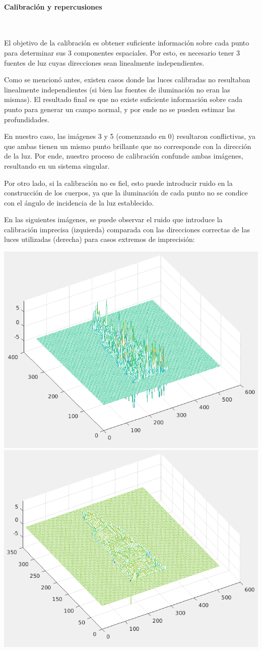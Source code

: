 \paragraph{Calibración y repercusiones}
\

El objetivo de la calibración es obtener suficiente información sobre cada punto
para determinar sus 3 componentes espaciales. Por esto, es necesario tener 3
fuentes de luz cuyas direcciones sean linealmente independientes.

Como se mencionó antes, existen casos donde las luces calibradas no resultaban
linealmente independientes (si bien las fuentes de iluminación no eran las mismas).
El resultado final es que no existe suficiente información sobre cada punto
para generar un campo normal, y por ende no se pueden estimar las profundidades.

En nuestro caso, las imágenes 3 y 5 (comenzando en 0) resultaron conflictivas,
ya que ambas tienen un mismo punto brillante que no corresponde con la dirección
de la luz. Por ende, nuestro proceso de calibración confunde ambas imágenes,
resultando en un sistema singular.

Por otro lado, si la calibración no es fiel, esto puede introducir ruido en
la construcción de los cuerpos, ya que la iluminación de cada punto no
se condice con el ángulo de incidencia de la luz establecido.

En las siguientes imágenes, se puede observar el ruido que introduce la calibración
imprecisa (izquierda) comparada con las direcciones correctas de las luces utilizadas
(derecha) para casos extremos de imprecisión:

\begin{center}
\includegraphics[width=.4\linewidth]{imagenes/calib-ruido.png}
\includegraphics[width=.4\linewidth]{imagenes/luces-limpio.png}
\end{center}

